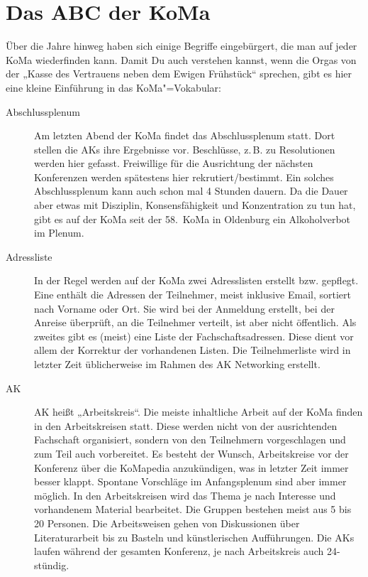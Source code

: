 \chapter{Das ABC der KoMa}

Über die Jahre hinweg haben sich einige Begriffe eingebürgert, die man auf
jeder KoMa wiederfinden kann. Damit Du auch verstehen kannst, wenn die Orgas
von der „Kasse des Vertrauens neben dem Ewigen Frühstück“ sprechen, gibt es
hier eine kleine Einführung in das KoMa"=Vokabular:

\begin{description}
\item[Abschlussplenum] Am letzten Abend der KoMa findet das Abschlussplenum
	statt. Dort stellen die AKs ihre Ergebnisse vor. Beschlüsse, z.\,B. zu
	Resolutionen werden hier gefasst.  Freiwillige für die Ausrichtung der
	nächsten Konferenzen werden spätestens hier rekrutiert/bestimmt. Ein
	solches Abschlussplenum kann auch schon mal 4 Stunden dauern.  Da die
	Dauer aber etwas mit Disziplin, Konsensfähigkeit und Konzentration zu
	tun hat, gibt es auf der KoMa seit der 58.~KoMa in Oldenburg ein
	Alkoholverbot im Plenum.

\item[Adressliste] In der Regel werden auf der KoMa zwei Adresslisten erstellt
	bzw. gepflegt. Eine enthält die Adressen der Teilnehmer, meist inklusive
	Email, sortiert nach Vorname oder Ort. Sie wird bei der Anmeldung
	erstellt, bei der Anreise überprüft, an die Teilnehmer verteilt, ist
	aber nicht öffentlich. Als zweites gibt es (meist) eine Liste der
	Fachschaftsadressen. Diese dient vor allem der Korrektur der
	vorhandenen Listen. Die Teilnehmerliste wird in letzter Zeit
	üblicherweise im Rahmen des AK Networking erstellt.

\item[AK] AK heißt „Arbeitskreis“. Die meiste inhaltliche Arbeit auf der KoMa
	finden in den Arbeitskreisen statt. Diese werden nicht von der
	ausrichtenden Fachschaft organisiert, sondern von den Teilnehmern
	vorgeschlagen und zum Teil auch vorbereitet. Es besteht der Wunsch,
	Arbeitskreise vor der Konferenz über die KoMapedia anzukündigen, was in
	letzter Zeit immer besser klappt. Spontane Vorschläge im Anfangsplenum
	sind aber immer möglich. In den Arbeitskreisen wird das Thema je nach
	Interesse und vorhandenem Material bearbeitet. Die Gruppen bestehen
	meist aus 5 bis 20 Personen. Die Arbeitsweisen gehen von Diskussionen
	über Literaturarbeit bis zu Basteln und künstlerischen Aufführungen.
	Die AKs laufen während der gesamten Konferenz, je nach Arbeitskreis
	auch 24-stündig.


\end{description}
